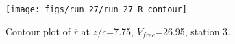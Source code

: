 \begin{figure}[H]
\centering
\texttt{[image: figs/run\_27/run\_27\_R\_contour]}
\caption{Contour plot of $\overline{r}$ at $z/c$=7.75, $V_{free}$=26.95, station 3.}
\label{fig:run_27_R_contour}
\end{figure}



